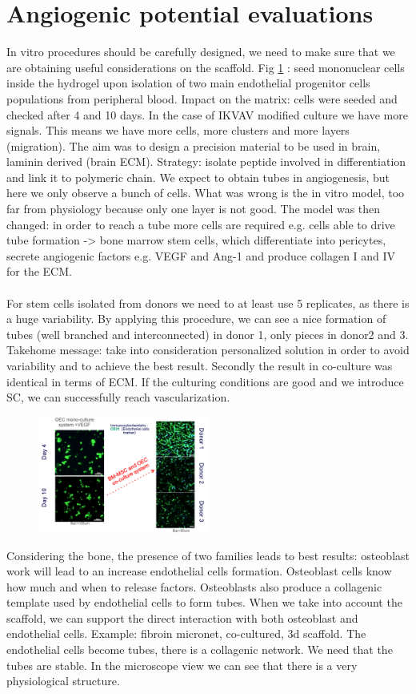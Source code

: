 \section{Angiogenic potential evaluations}
In vitro procedures should be carefully designed, we need to make sure that we are obtaining useful considerations on the scaffold. 
Fig \ref{fig:coculture} : seed mononuclear cells inside the hydrogel upon isolation of two main endothelial progenitor cells populations from peripheral blood.
Impact on the matrix: cells were seeded and checked after 4 and 10 days. In the case of IKVAV modified culture we have more signals. This means we have more cells, more clusters and more layers (migration). The aim was to design a precision material to be used in brain, laminin derived (brain ECM). Strategy:  isolate peptide involved in differentiation and link it to polymeric chain. 
We expect to obtain tubes in angiogenesis, but here we only observe a bunch of cells. What was wrong is the in vitro model, too far from physiology because only one layer is not good. The model was then changed: in order to reach a tube more cells are required e.g. cells able to drive tube formation -> bone marrow stem cells, which differentiate into pericytes, secrete angiogenic factors e.g. VEGF and Ang-1 and produce collagen I and IV for the ECM. 
\\
\\
\noindent
For stem cells isolated from donors we need to at least use 5 replicates, as there is a huge variability.  By applying this procedure, we can see a nice formation of tubes (well branched and interconnected) in donor 1, only pieces in donor2 and 3. Takehome message: take into consideration personalized solution in order to avoid variability and to achieve the best result. Secondly the result in co-culture was identical in terms of ECM. If the culturing conditions are good and we introduce SC, we can successfully reach vascularization.

\begin{figure}[h]
\centering
\includegraphics[width=0.5\textwidth]{coculture}
\caption{\label{fig:coculture}}
\end{figure}
\noindent
Considering the bone, the presence of two families leads to best results: osteoblast work will lead to an increase endothelial cells formation. Osteoblast cells know how much and when to release factors. Osteoblasts also produce a collagenic template used by endothelial cells to form tubes. When we take into account the scaffold, we can support the direct interaction with both osteoblast and endothelial cells. 
Example: fibroin micronet, co-cultured, 3d scaffold. The endothelial cells become tubes, there is a collagenic network.
We need that the tubes are stable. In the microscope view we can see that there is a very physiological structure. 

